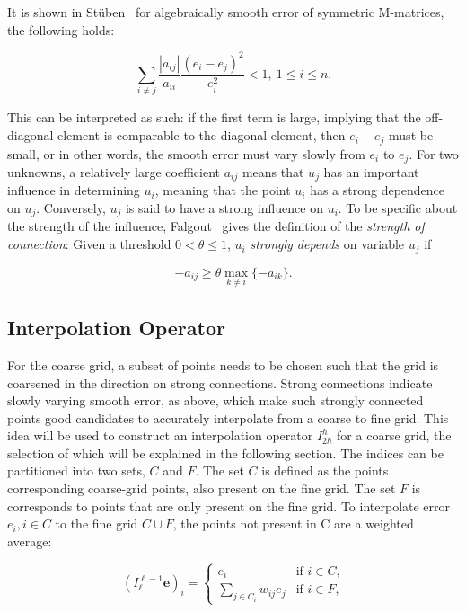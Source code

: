 It is shown in Stüben~\cite{Stuben1999} for algebraically smooth error of symmetric M-matrices, the following holds:

\begin{equation}
	\sum_{i \neq j}{\frac{|a_{ij}|}{a_{ii}}\frac{(e_i - e_j)^2}{e_i^2}} < 1,\ 1 \leq i \leq n.
	\label{eq:strong_connection}
\end{equation}

This can be interpreted as such: if the first term is large, implying that the off-diagonal element is comparable to the diagonal element, then $e_i - e_j$ must be small, or in other words, the smooth error must vary slowly from $e_i$ to $e_j$. For two unknowns, a relatively large coefficient $a_{ij}$ means that $u_j$ has an important influence in determining $u_i$, meaning that the point $u_i$ has a strong dependence on $u_j$. Conversely, $u_j$ is said to have a strong influence on $u_i$. To be specific about the strength of the influence, Falgout~\cite{Falgout2006} gives the definition of the \emph{strength of connection}: Given a threshold $0 < \theta \leq 1$, $u_i$ \emph{strongly depends} on variable $u_j$ if

\begin{equation}
-a_{ij} \geq \theta \max_{k \neq i}{\{-a_{ik}\}}.
\label{eq:strong_connection2}
\end{equation}

\subsection{Interpolation Operator}

For the coarse grid, a subset of points needs to be chosen such that the grid is coarsened in the direction on strong connections. Strong connections indicate slowly varying smooth error, as above, which make such strongly connected points good candidates to accurately interpolate from a coarse to fine grid. This idea will be used to construct an interpolation operator $I_{2h}^h$ for a coarse grid, the selection of which will be explained in the following section. The indices can be partitioned into two sets, $C$ and $F$. The set $C$ is defined as the points corresponding coarse-grid points, also present on the fine grid. The set $F$ is corresponds to points that are only present on the fine grid. To interpolate error $e_i, i \in C$ to the fine grid $C \cup F$, the points not present in C are a weighted average:

\begin{equation}
	(I_{\ell}^{\ell-1}\mathbf{e})_i =
		\begin{cases}
			e_i & \text{if $i \in C$,} \\
			\displaystyle \sum_{j \in C_i}{w_{ij}e_j} & \text{if $i \in F$,}
		\end{cases}
	\label{eq:interpolation_operator}
\end{equation}

